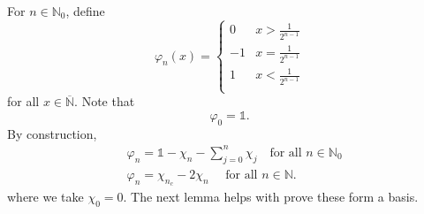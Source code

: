 \documentclass[]{amsart}
\newcommand{\ninn}{n \in \N}
\newcommand{\ninnz}{n \in \N_0 }
\newcommand{\overn}{\overline{\N}}
\newcommand{\vhi}{{\varphi}}
\newcommand{\N}{{\mathds{N}}}
\theoremstyle{plain}
\theoremstyle{definition}
\theoremstyle{remark}
\numberwithin{equation}{section}
\begin{document}
     For $\ninnz$, define
    \[ \vhi_n (x)= \begin{cases} 0 & x>\frac{1}{2^{n-1}}\\
                              -1 & x = \frac{1}{2^{n-1}}\\
                             1 & x < \frac{1}{2^{n-1}}\\
                 \end{cases}\]
                 for all $x \in \overn$. Note that
                 \[
                 \vhi_0=\mathds{1}.
                 \]
                  By construction, 
\begin{equation}\label{eq:phi}
\begin{split}
& \vhi_n =  
       \mathds{1}-\chi_n-\sum_{j=0}^n \chi_j  \quad \text{for all } \ninnz\\
       & \vhi_n=\chi_{n_c}-2\chi_n \quad \text{ for all } \ninn.
       \end{split}
\end{equation} 
where we take $\chi_0=0$. The next lemma helps with prove these form a basis.
\end{document}
